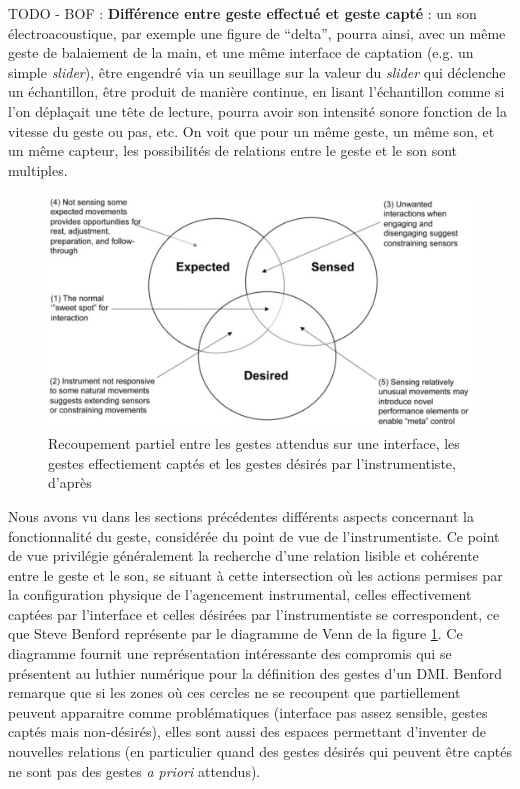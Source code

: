 TODO - BOF : \textbf{Différence entre geste effectué et geste capté} : un son électroacoustique, par exemple une figure de ``delta'', pourra ainsi, avec un même geste de balaiement de la main, et une même interface de captation (e.g. un simple \textit{slider}), être engendré via un seuillage sur la valeur du \textit{slider} qui déclenche un échantillon, être produit de manière continue, en lisant l'échantillon comme si l'on déplaçait une tête de lecture, pourra avoir son intensité sonore fonction de la vitesse du geste ou pas, etc. On voit que pour un même geste, un même son, et un même capteur, les possibilités de relations entre le geste et le son sont multiples.\\
\begin{figure}[!ht]
	\captionsetup{format=plain}%
	  \includegraphics[width=\linewidth]{gfx/03_gesture/Benford_expected-sensed-desired.png}
		\caption[Recoupement partiel entre les gestes attendus sur une interface, les gestes désirés par l'instrumentiste, et les gestes effectiement captés]{Recoupement partiel entre les gestes attendus sur une interface, les gestes effectiement captés et les gestes désirés par l'instrumentiste, d'après \cite{benford_performing_2010}}
		\label{fig:Benford_expected-sensed-desired}
\end{figure}
\noindent Nous avons vu dans les sections précédentes différents aspects concernant la fonctionnalité du geste, considérée du point de vue de l'instrumentiste. Ce point de vue privilégie généralement la recherche d'une relation lisible et cohérente entre le geste et le son, se situant à cette intersection où les actions permises par la configuration physique de l'agencement instrumental, celles effectivement captées par l'interface et celles désirées par l'instrumentiste se correspondent, ce que Steve Benford représente par le diagramme de Venn de la figure \ref{fig:Benford_expected-sensed-desired}. Ce diagramme fournit une représentation intéressante des compromis qui se présentent au luthier numérique pour la définition des gestes d'un \gls{DMI}. Benford remarque que si les zones où ces cercles ne se recoupent que partiellement peuvent apparaitre comme problématiques (interface pas assez sensible, gestes captés mais non-désirés), elles sont aussi des espaces permettant d'inventer de nouvelles relations (en particulier quand des gestes désirés qui peuvent être captés ne sont pas des gestes \textit{a priori} attendus).
